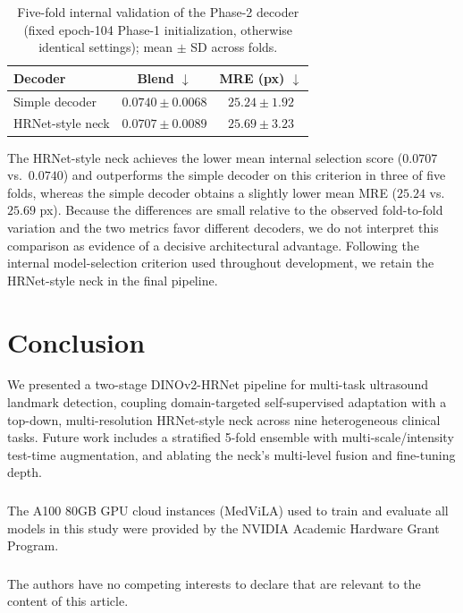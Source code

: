 \documentclass[runningheads]{llncs}
\begin{document}
\begin{table}[tb]
\caption{Five-fold internal validation of the Phase-2 decoder (fixed epoch-104 Phase-1 initialization, otherwise identical settings); mean $\pm$ SD across folds.}
\label{tab:decoder-ablation}
\centering
\begin{tabular}{lcc}
\toprule
\textbf{Decoder} & \textbf{Blend $\downarrow$} & \textbf{MRE (px) $\downarrow$} \\
\midrule
Simple decoder & $0.0740 \pm 0.0068$ & $\mathbf{25.24 \pm 1.92}$ \\
HRNet-style neck & $\mathbf{0.0707 \pm 0.0089}$ & $25.69 \pm 3.23$ \\
\bottomrule
\end{tabular}
\end{table}

The HRNet-style neck achieves the lower mean internal selection score ($0.0707$ vs.\ $0.0740$) and outperforms the simple decoder on this criterion in three of five folds, whereas the simple decoder obtains a slightly lower mean MRE ($25.24$ vs.\ $25.69$ px). Because the differences are small relative to the observed fold-to-fold variation and the two metrics favor different decoders, we do not interpret this comparison as evidence of a decisive architectural advantage. Following the internal model-selection criterion used throughout development, we retain the HRNet-style neck in the final pipeline.

\section{Conclusion}
We presented a two-stage DINOv2-HRNet pipeline for multi-task ultrasound landmark detection, coupling domain-targeted self-supervised adaptation with a top-down, multi-resolution HRNet-style neck across nine heterogeneous clinical tasks. Future work includes a stratified 5-fold ensemble with multi-scale/intensity test-time augmentation, and ablating the neck's multi-level fusion and fine-tuning depth.

\begin{credits}
\subsubsection{\ackname} %
The A100 80GB GPU cloud instances (MedViLA) used to train and evaluate all models in this study were provided by the NVIDIA Academic Hardware Grant Program.
\subsubsection{\discintname}
The authors have no competing interests to declare that are relevant to
the content of this article.
\end{credits}

%
%


\end{document}
